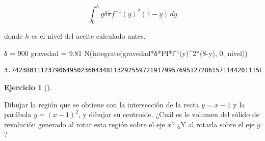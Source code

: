 \documentclass[
  a4paper,
]{scrreport}
\newenvironment{Shaded}{\begin{snugshade}}{\end{snugshade}}
\newcommand{\FloatTok}[1]{\textcolor[rgb]{0.68,0.00,0.00}{#1}}
\newcommand{\FunctionTok}[1]{\textcolor[rgb]{0.28,0.35,0.67}{#1}}
\newcommand{\NormalTok}[1]{\textcolor[rgb]{0.00,0.23,0.31}{#1}}
\newcommand{\OperatorTok}[1]{\textcolor[rgb]{0.37,0.37,0.37}{#1}}
\theoremstyle{definition}
\newtheorem{exercise}{Ejercicio}[chapter]
\theoremstyle{remark}
\begin{document}
\begin{tcolorbox}
\[
\int_0^h g\delta\pi f^{-1}(y)^2(4-y)\,dy
\]

donde \(h\) es el nivel del aceite calculado antes.

\begin{Shaded}
\begin{Highlighting}[]
\NormalTok{δ }\OperatorTok{=} \FloatTok{900}
\NormalTok{gravedad }\OperatorTok{=} \FloatTok{9.81}
\FunctionTok{N}\NormalTok{(}\FunctionTok{integrate}\NormalTok{(}\FunctionTok{gravedad*δ*PI*f⁻¹}\NormalTok{(y)}\OperatorTok{\^{}}\FloatTok{2}\FunctionTok{*}\NormalTok{(}\FloatTok{8}\OperatorTok{{-}}\NormalTok{y), }\FloatTok{0}\NormalTok{, nivel))}
\end{Highlighting}
\end{Shaded}

\begin{verbatim}
3.742380111237906495023604348113292559721917995769512728615711442011158430753357e+06
\end{verbatim}

\end{tcolorbox}

\begin{exercise}[]\protect\hypertarget{exr-centro-masas}{}\label{exr-centro-masas}

Dibujar la región que se obtiene con la intersección de la recta
\(y=x-1\) y la parábola \(y=(x-1)^2\), y dibujar su centroide. ¿Cuál es
le volumen del sólido de revolución generado al rotar esta región sobre
el eje \(x\)? ¿Y al rotarla sobre el eje \(y\)?

\end{exercise}
\end{document}
